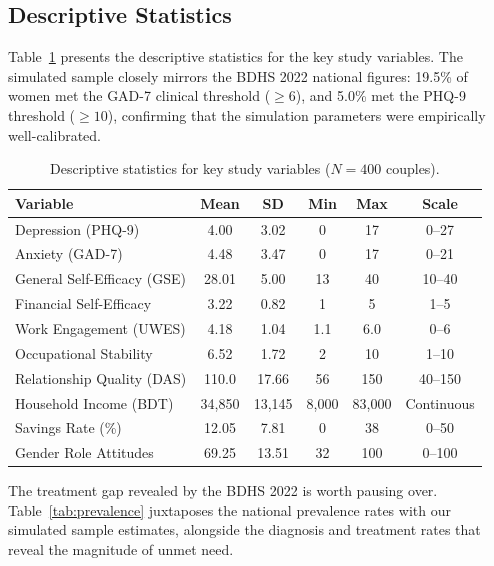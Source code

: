 \documentclass[12pt, a4paper]{article}
\begin{document}
\subsection{Descriptive Statistics}

Table~\ref{tab:descriptive} presents the descriptive statistics for the key study variables. The simulated sample closely mirrors the BDHS 2022 national figures: 19.5\% of women met the GAD-7 clinical threshold ($\geq 6$), and 5.0\% met the PHQ-9 threshold ($\geq 10$), confirming that the simulation parameters were empirically well-calibrated.

\begin{table}[H]
\centering
\caption{Descriptive statistics for key study variables ($N = 400$ couples).}
\label{tab:descriptive}
\small
\begin{tabular}{lccccc}
\toprule
\textbf{Variable} & \textbf{Mean} & \textbf{SD} & \textbf{Min} & \textbf{Max} & \textbf{Scale} \\
\midrule
Depression (PHQ-9)          & 4.00  & 3.02  & 0   & 17  & 0--27   \\
Anxiety (GAD-7)             & 4.48  & 3.47  & 0   & 17  & 0--21   \\
General Self-Efficacy (GSE) & 28.01 & 5.00  & 13  & 40  & 10--40  \\
Financial Self-Efficacy     & 3.22  & 0.82  & 1   & 5   & 1--5    \\
Work Engagement (UWES)      & 4.18  & 1.04  & 1.1 & 6.0 & 0--6    \\
Occupational Stability      & 6.52  & 1.72  & 2   & 10  & 1--10   \\
Relationship Quality (DAS)  & 110.0 & 17.66 & 56  & 150 & 40--150 \\
Household Income (BDT)      & 34,850 & 13,145 & 8,000 & 83,000 & Continuous \\
Savings Rate (\%)           & 12.05 & 7.81  & 0   & 38  & 0--50   \\
Gender Role Attitudes       & 69.25 & 13.51 & 32  & 100 & 0--100  \\
\bottomrule
\end{tabular}
\end{table}

The treatment gap revealed by the BDHS 2022 is worth pausing over. Table~\ref{tab:prevalence} juxtaposes the national prevalence rates with our simulated sample estimates, alongside the diagnosis and treatment rates that reveal the magnitude of unmet need.
\end{document}
